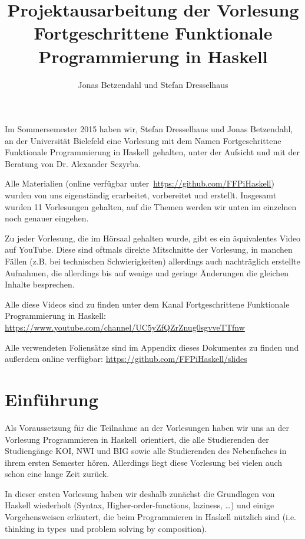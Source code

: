 \documentclass[10pt,a4paper]{article}
\author{Jonas Betzendahl und Stefan Dresselhaus}
\title{\textbf{Projektausarbeitung der Vorlesung\\Fortgeschrittene Funktionale Programmierung in Haskell}}
\begin{document}
\maketitle
\tableofcontents
\bigskip\bigskip\bigskip

Im Sommersemester 2015 haben wir, Stefan Dresselhaus und Jonas Betzendahl, an der Universität Bielefeld eine Vorlesung mit dem Namen \glqq Fortgeschrittene Funktionale Programmierung in Haskell\grqq\ gehalten, unter der Aufsicht und mit der Beratung von Dr. Alexander Sczyrba.

Alle Materialien (online verfügbar unter \,\url{https://github.com/FFPiHaskell}) wurden von uns eigenständig erarbeitet, vorbereitet und erstellt. Insgesamt wurden 11 Vorlesungen gehalten, auf die Themen werden wir unten im einzelnen noch genauer eingehen.
\bigskip

Zu jeder Vorlesung, die im Hörsaal gehalten wurde, gibt es ein äquivalentes Video auf YouTube.
Diese sind oftmals direkte Mitschnitte der Vorlesung, in manchen Fällen (z.B. bei technischen Schwierigkeiten) allerdings auch nachträglich erstellte Aufnahmen, die allerdings bis auf wenige und geringe Änderungen die gleichen Inhalte besprechen.

Alle diese Videos sind zu finden unter dem Kanal \glqq Fortgeschrittene Funktionale Programmierung in Haskell\grqq : \;\url{https://www.youtube.com/channel/UC5yZfQZrZnug0sgvveTTfnw}
\bigskip

Alle verwendeten Foliensätze sind im Appendix dieses Dokumentes zu finden und außerdem online verfügbar: \;\url{https://github.com/FFPiHaskell/slides}

\newpage

\section{Einführung}

Als Voraussetzung für die Teilnahme an der Vorlesungen haben wir uns an der Vorlesung \glqq Programmieren in Haskell\grqq\ orientiert, die alle Studierenden der Studiengänge KOI, NWI und BIG sowie alle Studierenden des Nebenfaches in ihrem ersten Semester hören. Allerdings liegt diese Vorlesung bei vielen auch schon eine lange Zeit zurück.

In dieser ersten Vorlesung haben wir deshalb zunächst die Grundlagen von Haskell wiederholt (Syntax, Higher-order-functions, laziness, \dots) und einige Vorgehensweisen erläutert, die beim Programmieren in Haskell nützlich sind (i.e. \glqq thinking in types\grqq\ und \glqq problem solving by composition\grqq).
\end{document}
